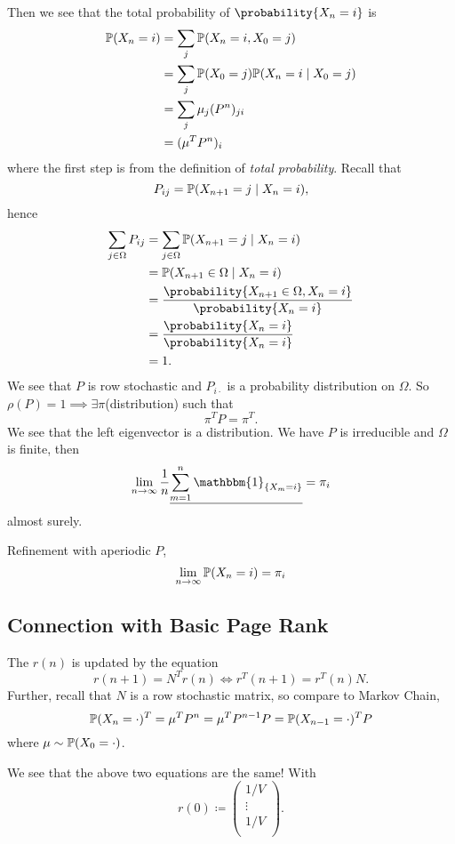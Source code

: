 \begin{itemize}
	      Then we see that the total probability of \(\probability{X_n = i}\) is
	      \[
		      \begin{split}
			      \mathbb{\MakeUppercase{P}}(X_n = i) &= \sum_j \mathbb{\MakeUppercase{P}}(X_n = i, X_0 = j)\\
			      &= \sum_j \mathbb{\MakeUppercase{P}}(X_0 = j)\mathbb{\MakeUppercase{P}}(X_n = i  \mid  X_0 = j) \\
			      &=\sum_j \mu_{j} (P^n)_{ji}\\
			      &= (\mu^{T} P^n)_i
		      \end{split}
	      \]
	      where the first step is from the definition of \emph{total probability}. Recall that
	      \[
		      P_{ij} = \mathbb{\MakeUppercase{P}}(X_{n+1} = j \mid X_n = i),
	      \]
	      hence
	      \[
		      \begin{split}
			      \sum_{j\in \Omega} P_{ij} &= \sum_{j\in \Omega} \mathbb{\MakeUppercase{P}}(X_{n+1} = j \mid X_n = i)\\
			      &= \mathbb{\MakeUppercase{P}}(X_{n+1}\in \Omega \mid X_n = i) \\
			      &= \frac{\probability{X_{n+1}\in \Omega, X_n = i} }{\probability{X_n = i} }\\
			      &= \frac{\probability{X_n = i} }{\probability{X_n = i} }\\
			      &= 1.
		      \end{split}
	      \]
	      We see that \(P\) is row stochastic and \(P_{i\cdot}\) is a probability distribution on \(\Omega\). So \(\rho(P) = 1\implies \exists  \pi\)(distribution) such that
	      \[
		      \pi^{T} P = \pi^{T}.
	      \]
	      We see that the left eigenvector is a distribution. We have \(P\) is irreducible and \(\Omega\) is finite, then
	      \[
		      \lim_{n\to \infty } \frac{1}{n}\underline{\sum\limits_{m=1}^{n}  \mathbbm{1}_{\left\{ X_m = i \right\} }} = \pi_i
	      \]
	      almost surely.
\end{itemize}

Refinement with aperiodic \(P\),
\[
	\lim_{n\to \infty }\mathbb{\MakeUppercase{P}}(X_n = i) = \pi_i
\]

\subsection{Connection with Basic Page Rank}
\begin{prev}
	The \(r(n)\) is updated by the equation
	\[
		r(n+1) = N^{T}r(n) \iff r^{T}(n+1) = r^{T}(n)N.
	\]
	Further, recall that \(N\) is a row stochastic matrix, so compare to Markov Chain,
	\[
		\mathbb{\MakeUppercase{P}}(X_n = \cdot)^{T} = \mu^{T}P^n = \mu^{T}P^{n-1}P = \mathbb{\MakeUppercase{P}}(X_{n-1} = \cdot)^{T}P
	\]
	where \(\mu\sim \mathbb{\MakeUppercase{P}}(X_0 = \cdot)\).

	We see that the above two equations are the same! With
	\[
		r(0)\coloneqq \begin{pmatrix}
			1/V    \\
			\vdots \\
			1/V    \\
		\end{pmatrix}.
	\]
\end{prev}

